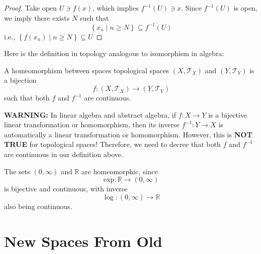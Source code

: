 \begin{proof} Take open \(U \ni  f\left(x\right)\), which implies \({f}^{-1}\left(U\right)  \ni  x\). Since \({f}^{-1}\left(U\right)\) is open, we imply there exists \(N\) such that
\[
\left\{  {x_n \mid  n \geq  N}\right\}   \subseteq  {f}^{-1}\left(U\right)
\]
i.e., \(\left\{  {f\left(x_n\right)  \mid  n \geq  N}\right\}   \subseteq  U\)
\end{proof}

Here is the definition in topology analogous to isomorphism in algebra:
\begin{definition}[Homeomorphism] A homeomorphism between spaces topological spaces \(\left({X,{\mathcal{T}}_X}\right)\) and \(\left({Y,{\mathcal{T}}_Y}\right)\) is a bijection
\[
f : \left({X,{\mathcal{T}}_X}\right)  \rightarrow  \left({Y,{\mathcal{T}}_Y}\right)
\]
such that both \(f\) and \({f}^{-1}\) are continuous.
\end{definition}

{\bf WARNING:} In linear algebra and abstract algebra, if $f: X \to Y$ is a bijective linear transformation or homomorphism, then its inverse $f^{-1}: Y \to X$ is automatically a linear transformation or homomorphism. However, this is {\bf NOT TRUE} for topological spaces! Therefore, we need to decree that both $f$ and $f^{-1}$ are continuous in our definition above.

\begin{example}
    The sets $(0,\infty)$ and $\mathbb{R}$ are homeomorphic, since
    $$\mathrm{exp}: \mathbb{R} \to (0,\infty)$$
    is bijective and continuous, with inverse
    $$\log: (0,\infty) \to \mathbb{R}$$
    also being continuous.
\end{example}
\section{New Spaces From Old}

